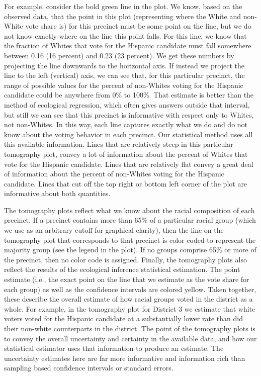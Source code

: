 \documentclass[12pt]{scrartcl}
\begin{document}
For example, consider the bold green line in the plot. We know, based on the observed data, that the point in this plot (representing where the White and non-White vote share is) for this precinct must be some point on the line, but we do not know exactly where on the line this point falls. For this line, we know that the fraction of Whites that vote for the Hispanic candidate must fall somewhere between 0.16 (16 percent) and 0.23 (23 percent). We get these numbers by projecting the line downwards to the horizontal axis. If instead we project the line to the left (vertical) axis, we can see that, for this particular precinct, the range of possible values for the percent of non-Whites voting for the Hispanic candidate could be anywhere from 0\% to 100\%. That estimate is better than the method of ecological regression, which often gives answers outside that interval, but still we can see that this precinct is informative with respect only to Whites, not non-Whites. In this way, each line captures exactly what we do and do not know about the voting behavior in each precinct. Our statistical method uses all this available information. Lines that are relatively steep in this particular tomography plot, convey a lot of information about the percent of Whites that vote for the Hispanic candidate. Lines that are relatively flat convey a great deal of information about the percent of non-Whites voting for the Hispanic candidate. Lines that cut off the top right or bottom left corner of the plot are informative about both quantities.

The tomography plots reflect what we know about the racial composition of each precinct. If a precinct contains more than 65\% of a particular racial group (which we use as an arbitrary cutoff for graphical clarity), then the line on the tomography plot that corresponds to that precinct is color coded to represent the majority group (see the legend in the plot). If no groups comprise 65\% or more of the precinct, then no color code is assigned. 
Finally, the tomography plots also reflect the results of the ecological inference statistical estimation. The point estimate (i.e., the exact point on the line that we estimate as the vote share for each group) as well as the confidence intervals are colored yellow. Taken together, these describe the overall estimate of how racial groups voted in the district as a whole. For example, in the tomography plot for District 3 we estimate that white voters voted for the Hispanic candidate at a substantially lower rate than did their non-white counterparts in the district.  
The point of the tomography plots is to convey the overall uncertainty and certainty in the available data, and how our statistical estimator uses that information to produce an estimate. The uncertainty estimates here are far more informative and information rich than sampling based confidence intervals or standard errors.
\end{document}
